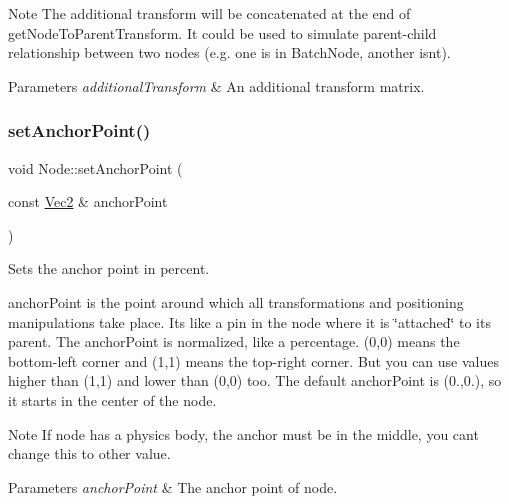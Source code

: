 \begin{DoxyNote}{Note}
The additional transform will be concatenated at the end of get\+Node\+To\+Parent\+Transform. It could be used to simulate {\ttfamily parent-\/child} relationship between two nodes (e.\+g. one is in Batch\+Node, another isn\textquotesingle{}t).
\end{DoxyNote}

\begin{DoxyParams}{Parameters}
{\em additional\+Transform} & An additional transform matrix. \\
\hline
\end{DoxyParams}
\mbox{\label{classNode_a4dd45cb48a51df7c257675f527e3f277}} 
\subsubsection{\texorpdfstring{set\+Anchor\+Point()}{setAnchorPoint()}\hspace{0.1cm}{\footnotesize\ttfamily [1/2]}}
{\footnotesize\ttfamily void Node\+::set\+Anchor\+Point (\begin{DoxyParamCaption}\item[{const \hyperlink{classVec2}{Vec2} \&}]{anchor\+Point }\end{DoxyParamCaption})\hspace{0.3cm}{\ttfamily [virtual]}}

Sets the anchor point in percent.

anchor\+Point is the point around which all transformations and positioning manipulations take place. It\textquotesingle{}s like a pin in the node where it is \char`\"{}attached\char`\"{} to its parent. The anchor\+Point is normalized, like a percentage. (0,0) means the bottom-\/left corner and (1,1) means the top-\/right corner. But you can use values higher than (1,1) and lower than (0,0) too. The default anchor\+Point is (0.,0.), so it starts in the center of the node. \begin{DoxyNote}{Note}
If node has a physics body, the anchor must be in the middle, you can\textquotesingle{}t change this to other value.
\end{DoxyNote}

\begin{DoxyParams}{Parameters}
{\em anchor\+Point} & The anchor point of node. \\
\hline
\end{DoxyParams}


